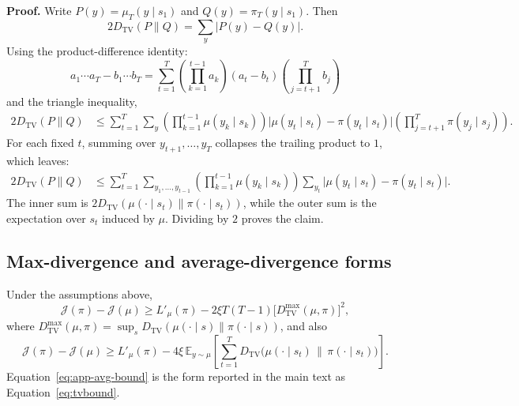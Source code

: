 \textbf{Proof.}
Write $P(y)=\mu_T(y\mid s_1)$ and $Q(y)=\pi_T(y\mid s_1)$. Then
\begin{equation*}
2D_{\mathrm{TV}}(P\|Q)=\sum_{y}|P(y)-Q(y)|.
\end{equation*}
Using the product-difference identity:
\begin{equation*}
a_1\cdots a_T-b_1\cdots b_T
=\sum_{t=1}^{T}\left(\prod_{k=1}^{t-1}a_k\right)(a_t-b_t)\left(\prod_{j=t+1}^{T}b_j\right)
\end{equation*}
and the triangle inequality,
\begin{align*}
2D_{\mathrm{TV}}(P\|Q)
&\le \sum_{t=1}^{T}\sum_{y}
\left(\prod_{k=1}^{t-1}\mu(y_k\mid s_k)\right)
\bigl|\mu(y_t\mid s_t)-\pi(y_t\mid s_t)\bigr|
\left(\prod_{j=t+1}^{T}\pi(y_j\mid s_j)\right).
\end{align*}
For each fixed $t$, summing over $y_{t+1},\dots,y_T$ collapses the trailing product to $1$, which leaves:
\begin{align*}
2D_{\mathrm{TV}}(P\|Q)
&\le \sum_{t=1}^{T}\sum_{y_1,\dots,y_{t-1}}
\left(\prod_{k=1}^{t-1}\mu(y_k\mid s_k)\right)
\sum_{y_t}\bigl|\mu(y_t\mid s_t)-\pi(y_t\mid s_t)\bigr|.
\end{align*}
The inner sum is $2D_{\mathrm{TV}}(\mu(\cdot\mid s_t)\|\pi(\cdot\mid s_t))$, while the outer sum is the expectation over $s_t$ induced by $\mu$. Dividing by $2$ proves the claim.

\subsection{Max-divergence and average-divergence forms}
\label{app:bound-proofs}

\begin{proposition}
\label{prop:app-bounds}
Under the assumptions above,
\begin{equation}
\mathcal J(\pi)-\mathcal J(\mu)
\ge L'_{\mu}(\pi)-2\xi T(T-1)\bigl[D_{\mathrm{TV}}^{\max}(\mu,\pi)\bigr]^2,
\label{eq:app-max-bound}
\end{equation}
where $D_{\mathrm{TV}}^{\max}(\mu,\pi)=\sup_s D_{\mathrm{TV}}(\mu(\cdot\mid s)\|\pi(\cdot\mid s))$, and also
\begin{equation}
\mathcal J(\pi)-\mathcal J(\mu)
\ge L'_{\mu}(\pi)-4\xi\,\mathbb E_{y\sim\mu}\left[\sum_{t=1}^{T}D_{\mathrm{TV}}\bigl(\mu(\cdot\mid s_t)\,\|\,\pi(\cdot\mid s_t)\bigr)\right].
\label{eq:app-avg-bound}
\end{equation}
Equation~\eqref{eq:app-avg-bound} is the form reported in the main text as Equation~\eqref{eq:tvbound}.
\end{proposition}

